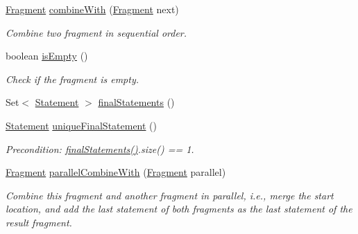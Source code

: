 \begin{DoxyCompactItemize}
\hyperlink{interfaceedu_1_1udel_1_1cis_1_1vsl_1_1civl_1_1model_1_1IF_1_1Fragment}{Fragment} \hyperlink{interfaceedu_1_1udel_1_1cis_1_1vsl_1_1civl_1_1model_1_1IF_1_1Fragment_a50d1ee6ab7637aa0f110d6d367fa8d9c}{combine\+With} (\hyperlink{interfaceedu_1_1udel_1_1cis_1_1vsl_1_1civl_1_1model_1_1IF_1_1Fragment}{Fragment} next)
\begin{DoxyCompactList}\small\item\em Combine two fragment in sequential order. \end{DoxyCompactList}\item 
boolean \hyperlink{interfaceedu_1_1udel_1_1cis_1_1vsl_1_1civl_1_1model_1_1IF_1_1Fragment_ac381e6dd0a6ab7c038ffdc46f4a8eb6f}{is\+Empty} ()
\begin{DoxyCompactList}\small\item\em Check if the fragment is empty. \end{DoxyCompactList}\item 
Set$<$ \hyperlink{interfaceedu_1_1udel_1_1cis_1_1vsl_1_1civl_1_1model_1_1IF_1_1statement_1_1Statement}{Statement} $>$ \hyperlink{interfaceedu_1_1udel_1_1cis_1_1vsl_1_1civl_1_1model_1_1IF_1_1Fragment_aa700b440666841cd053bb577d3709ea1}{final\+Statements} ()
\item 
\hyperlink{interfaceedu_1_1udel_1_1cis_1_1vsl_1_1civl_1_1model_1_1IF_1_1statement_1_1Statement}{Statement} \hyperlink{interfaceedu_1_1udel_1_1cis_1_1vsl_1_1civl_1_1model_1_1IF_1_1Fragment_a641ca0a39685ee55c97497b0803f084c}{unique\+Final\+Statement} ()
\begin{DoxyCompactList}\small\item\em Precondition\+: \hyperlink{interfaceedu_1_1udel_1_1cis_1_1vsl_1_1civl_1_1model_1_1IF_1_1Fragment_aa700b440666841cd053bb577d3709ea1}{final\+Statements()}.size() == 1. \end{DoxyCompactList}\item 
\hyperlink{interfaceedu_1_1udel_1_1cis_1_1vsl_1_1civl_1_1model_1_1IF_1_1Fragment}{Fragment} \hyperlink{interfaceedu_1_1udel_1_1cis_1_1vsl_1_1civl_1_1model_1_1IF_1_1Fragment_a34b0e7fef2fb116d9d36721802e2d16c}{parallel\+Combine\+With} (\hyperlink{interfaceedu_1_1udel_1_1cis_1_1vsl_1_1civl_1_1model_1_1IF_1_1Fragment}{Fragment} parallel)
\begin{DoxyCompactList}\small\item\em Combine this fragment and another fragment in parallel, i.\+e., merge the start location, and add the last statement of both fragments as the last statement of the result fragment. \end{DoxyCompactList}\item 

\end{DoxyCompactItemize}
